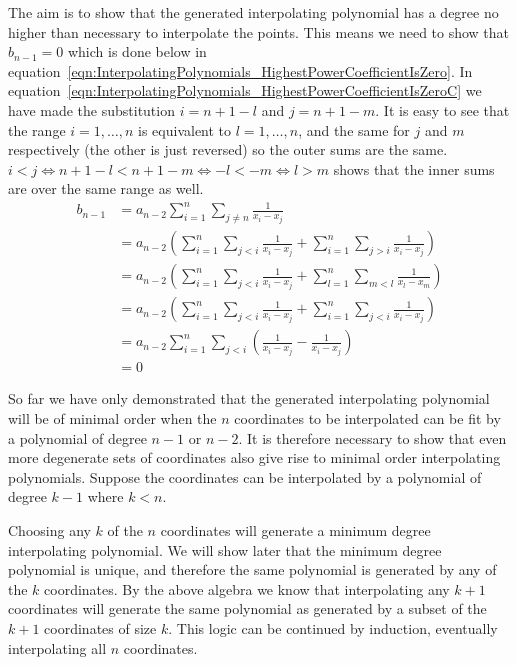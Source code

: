 The aim is to show that the generated interpolating polynomial has a degree no higher than necessary to interpolate the points. This means we need to show that $b_{n-1} = 0$ which is done below in equation~\eqref{eqn:InterpolatingPolynomials_HighestPowerCoefficientIsZero}. In equation~\eqref{eqn:InterpolatingPolynomials_HighestPowerCoefficientIsZeroC} we have made the substitution $i = n + 1 - l$ and $j = n + 1 - m$. It is easy to see that the range $i = 1, \dots, n$ is equivalent to $l = 1, \dots, n$, and the same for $j$ and $m$ respectively (the other is just reversed) so the outer sums are the same. $i < j \iff n + 1 - l < n + 1 - m \iff -l < -m \iff l > m$ shows that the inner sums are over the same range as well.
\begin{subequations}
	\begin{align}
		b_{n-1} &= a_{n-2} \sum_{i=1}^n \sum_{j \ne n} \frac{1}{x_i - x_j}  \\
		&= a_{n-2} \left( \sum_{i=1}^n \sum_{j<i} \frac{1}{x_i - x_j} + \sum_{i=1}^n \sum_{j>i} \frac{1}{x_i - x_j} \right)  \\
		&= a_{n-2} \left( \sum_{i=1}^n \sum_{j<i} \frac{1}{x_i - x_j} + \sum_{l=1}^n \sum_{m<l} \frac{1}{x_l - x_m} \right)\label{eqn:InterpolatingPolynomials_HighestPowerCoefficientIsZeroC}  \\
		&= a_{n-2} \left( \sum_{i=1}^n \sum_{j<i} \frac{1}{x_i - x_j} + \sum_{i=1}^n \sum_{j<i} \frac{1}{x_i - x_j}\right)  \\
		&= a_{n-2} \sum_{i=1}^n \sum_{j<i} \left( \frac{1}{x_i - x_j} - \frac{1}{x_i - x_j}\right)  \\
		&= 0
	\end{align}
	\label{eqn:InterpolatingPolynomials_HighestPowerCoefficientIsZero}
\end{subequations}

So far we have only demonstrated that the generated interpolating polynomial will be of minimal order when the $n$ coordinates to be interpolated can be fit by a polynomial of degree $n - 1$ or $n - 2$. It is therefore necessary to show that even more degenerate sets of coordinates also give rise to minimal order interpolating polynomials. Suppose the coordinates can be interpolated by a polynomial of degree $k - 1$ where $k < n$.

Choosing any $k$ of the $n$ coordinates will generate a minimum degree interpolating polynomial. We will show later that the minimum degree polynomial is unique, and therefore the same polynomial is generated by any of the $k$ coordinates. By the above algebra we know that interpolating any $k + 1$ coordinates will generate the same polynomial as generated by a subset of the $k + 1$ coordinates of size $k$. This logic can be continued by induction, eventually interpolating all $n$ coordinates.

